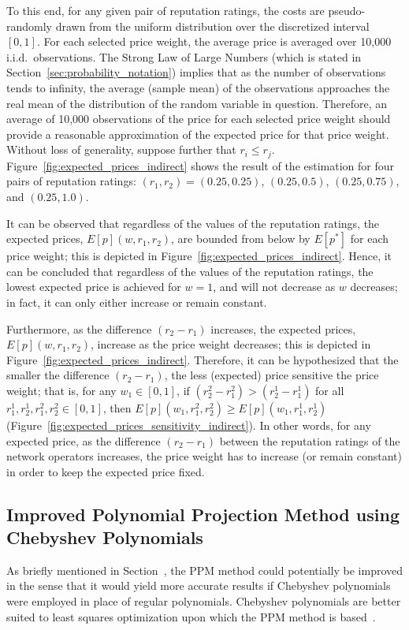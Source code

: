To this end, for any given pair of reputation ratings, the costs are pseudo-randomly drawn from the uniform distribution over the discretized interval $[0,1]$. For each selected price weight, the average price is averaged over 10,000 i.i.d.~observations. The Strong Law of Large Numbers (which is stated in Section~\ref{sec:probability_notation}) implies that as the number of observations tends to infinity, the average (sample mean) of the observations approaches the real mean of the distribution of the random variable in question. Therefore, an average of 10,000 observations of the price for each selected price weight should provide a reasonable approximation of the expected price for that price weight. Without loss of generality, suppose further that $r_i \le r_j$. Figure~\ref{fig:expected_prices_indirect} shows the result of the estimation for four pairs of reputation ratings: $(r_1, r_2) = (0.25, 0.25)$, $(0.25, 0.5)$, $(0.25, 0.75)$, and $(0.25, 1.0)$.

It can be observed that regardless of the values of the reputation ratings, the expected prices, $E[p](w,r_1,r_2)$, are bounded from below by $E[p^*]$ for each price weight; this is depicted in Figure~\ref{fig:expected_prices_indirect}. Hence, it can be concluded that regardless of the values of the reputation ratings, the lowest expected price is achieved for $w=1$, and will not decrease as $w$ decreases; in fact, it can only either increase or remain constant.

Furthermore, as the difference $(r_2-r_1)$ increases, the expected prices, $E[p](w,r_1,r_2)$, increase as the price weight decreases; this is depicted in Figure~\ref{fig:expected_prices_indirect}. Therefore, it can be hypothesized that the smaller the difference $(r_2-r_1)$, the less (expected) price sensitive the price weight; that is, for any $w_1\in[0,1]$, if $(r^2_2-r^2_1) > (r^1_2-r^1_1)$ for all $r^1_1,r^1_2,r^2_1,r^2_2\in [0,1]$, then $E[p](w_1,r^2_1,r^2_2) \ge E[p](w_1,r^1_1,r^1_2)$ (Figure~\ref{fig:expected_prices_sensitivity_indirect}). In other words, for any expected price, as the difference $(r_2-r_1)$ between the reputation ratings of the network operators increases, the price weight has to increase (or remain constant) in order to keep the expected price fixed.

\subsection{Improved Polynomial Projection Method using Chebyshev Polynomials} %
\label{sub:improved_polynomial_projection_method_using_chebyshev_polynomials_indirect}
As briefly mentioned in Section~, the PPM method could potentially be improved in the sense that it would yield more accurate results if Chebyshev polynomials were employed in place of regular polynomials. Chebyshev polynomials are better suited to least squares optimization upon which the PPM method is based~\cite{MasonApproximation2003,Hubbard2011}.

